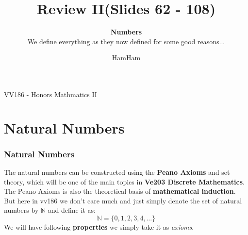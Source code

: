 \documentclass{beamer}
\title{\sffamily Review II(Slides 62 - 108)}
\subtitle{\textbf{Numbers}\\ We define everything as they now defined for some good reasons...}
\institute[UM-SJTU JI]{University of Michigan-Shanghai Jiao Tong University Joint Institute}
\author{HamHam}
\newcommand{\myfont}{\rmfamily\normalsize\upshape\mdseries}
\begin{document}
\begin{titlepage}
    \begin{center}
        VV186 - Honors Mathmatics II
    \end{center}
\end{titlepage}
\myfont
\section{Natural Numbers}
\begin{frame}
    \frametitle{Natural Numbers}
    \hspace{1em}
The natural numbers can be constructed using the 
\textbf{Peano Axioms} and set theory, 
which will be one of the main topics in \textbf{Ve203 Discrete Mathematics}. 
The Peano Axioms is also the theoretical basis of \textbf{mathematical induction}.
But here in vv186 we don't care much and just simply denote the set of natural numbers by $\mathbb{N}$ and define it as:
\begin{equation*}
    \mathbb{N}=\{0,1,2,3,4,\dots\}
\end{equation*}
    We will have following \textbf{properties} we simply take it as \emph{axioms}.
    \begin{table}
        \centering
    \end{table}
\end{frame}
\end{document}
